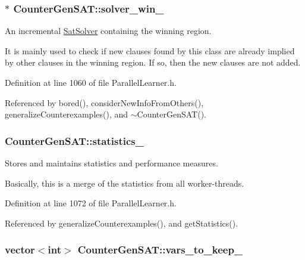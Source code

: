 \hypertarget{classCounterGenSAT_a4c209741406375df9ba19b830ca4d6f9}{
\subsubsection[{solver\-\_\-win\-\_\-}]{$\ast$ Counter\-Gen\-S\-A\-T\-::solver\-\_\-win\-\_\-\hspace{0.3cm}{\ttfamily [protected]}}}\label{classCounterGenSAT_a4c209741406375df9ba19b830ca4d6f9}


An incremental \hyperlink{classSatSolver}{Sat\-Solver} containing the winning region. 

It is mainly used to check if new clauses found by this class are already implied by other clauses in the winning region. If so, then the new clauses are not added. 

Definition at line 1060 of file Parallel\-Learner.\-h.



Referenced by bored(), consider\-New\-Info\-From\-Others(), generalize\-Counterexamples(), and $\sim$\-Counter\-Gen\-S\-A\-T().

\hypertarget{classCounterGenSAT_a0e7c47014a35bac7a6de0a61ee8d2c22}{
\subsubsection[{statistics\-\_\-}]{ Counter\-Gen\-S\-A\-T\-::statistics\-\_\-\hspace{0.3cm}{\ttfamily [protected]}}}\label{classCounterGenSAT_a0e7c47014a35bac7a6de0a61ee8d2c22}


Stores and maintains statistics and performance measures. 

Basically, this is a merge of the statistics from all worker-\/threads. 

Definition at line 1072 of file Parallel\-Learner.\-h.



Referenced by generalize\-Counterexamples(), and get\-Statistics().

\hypertarget{classCounterGenSAT_a0c568c2e441491d24a5a98623fa6ce6a}{
\subsubsection[{vars\-\_\-to\-\_\-keep\-\_\-}]{\setlength{\rightskip}{0pt plus 5cm}vector$<$int$>$ Counter\-Gen\-S\-A\-T\-::vars\-\_\-to\-\_\-keep\-\_\-\hspace{0.3cm}{\ttfamily [protected]}}}\label{classCounterGenSAT_a0c568c2e441491d24a5a98623fa6ce6a}


